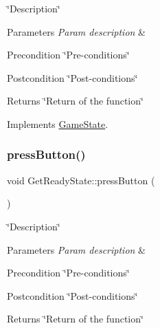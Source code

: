 \char`\"{}\+Description\char`\"{} 


\begin{DoxyParams}{Parameters}
{\em Param description} & \\
\hline
\end{DoxyParams}
\begin{DoxyPrecond}{Precondition}
\char`\"{}\+Pre-\/conditions\char`\"{} 
\end{DoxyPrecond}
\begin{DoxyPostcond}{Postcondition}
\char`\"{}\+Post-\/conditions\char`\"{} 
\end{DoxyPostcond}
\begin{DoxyReturn}{Returns}
\char`\"{}\+Return of the function\char`\"{} 
\end{DoxyReturn}


Implements \hyperlink{classGameState_afb05bd19a9c5cf27f6923b52f1ffc17b}{Game\+State}.

\mbox{\label{classGetReadyState_a414a505ec783b1bf577b1b859abaee46}} 
\subsubsection{\texorpdfstring{press\+Button()}{pressButton()}}
{\footnotesize\ttfamily void Get\+Ready\+State\+::press\+Button (\begin{DoxyParamCaption}{ }\end{DoxyParamCaption})\hspace{0.3cm}{\ttfamily [virtual]}}



\char`\"{}\+Description\char`\"{} 


\begin{DoxyParams}{Parameters}
{\em Param description} & \\
\hline
\end{DoxyParams}
\begin{DoxyPrecond}{Precondition}
\char`\"{}\+Pre-\/conditions\char`\"{} 
\end{DoxyPrecond}
\begin{DoxyPostcond}{Postcondition}
\char`\"{}\+Post-\/conditions\char`\"{} 
\end{DoxyPostcond}
\begin{DoxyReturn}{Returns}
\char`\"{}\+Return of the function\char`\"{} 
\end{DoxyReturn}


